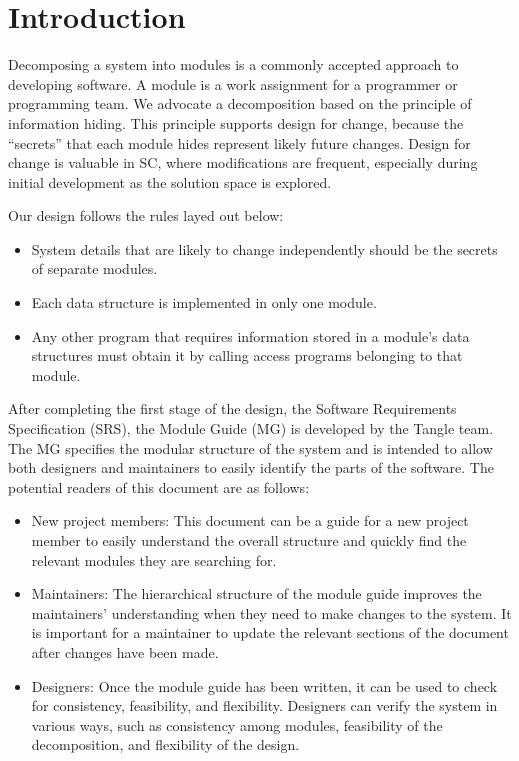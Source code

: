 \documentclass[12pt, titlepage]{article}
\begin{document}
\newpage

\tableofcontents

\listoftables

\listoffigures

\newpage


\section{Introduction}

Decomposing a system into modules is a commonly accepted approach to developing
software.  A module is a work assignment for a programmer or programming
team.  We advocate a decomposition
based on the principle of information hiding.  This
principle supports design for change, because the ``secrets'' that each module
hides represent likely future changes.  Design for change is valuable in SC,
where modifications are frequent, especially during initial development as the
solution space is explored.  

Our design follows the rules layed out below:
\begin{itemize}
\item System details that are likely to change independently should be the
  secrets of separate modules.
\item Each data structure is implemented in only one module.
\item Any other program that requires information stored in a module's data
  structures must obtain it by calling access programs belonging to that module.
\end{itemize}

After completing the first stage of the design, the Software Requirements
Specification (SRS), the Module Guide (MG) is developed by the Tangle team. The MG
specifies the modular structure of the system and is intended to allow both
designers and maintainers to easily identify the parts of the software.  The
potential readers of this document are as follows:

\begin{itemize}
\item New project members: This document can be a guide for a new project member
  to easily understand the overall structure and quickly find the
  relevant modules they are searching for.
\item Maintainers: The hierarchical structure of the module guide improves the
  maintainers' understanding when they need to make changes to the system. It is
  important for a maintainer to update the relevant sections of the document
  after changes have been made.
\item Designers: Once the module guide has been written, it can be used to
  check for consistency, feasibility, and flexibility. Designers can verify the
  system in various ways, such as consistency among modules, feasibility of the
  decomposition, and flexibility of the design.
\end{itemize}
\end{document}
